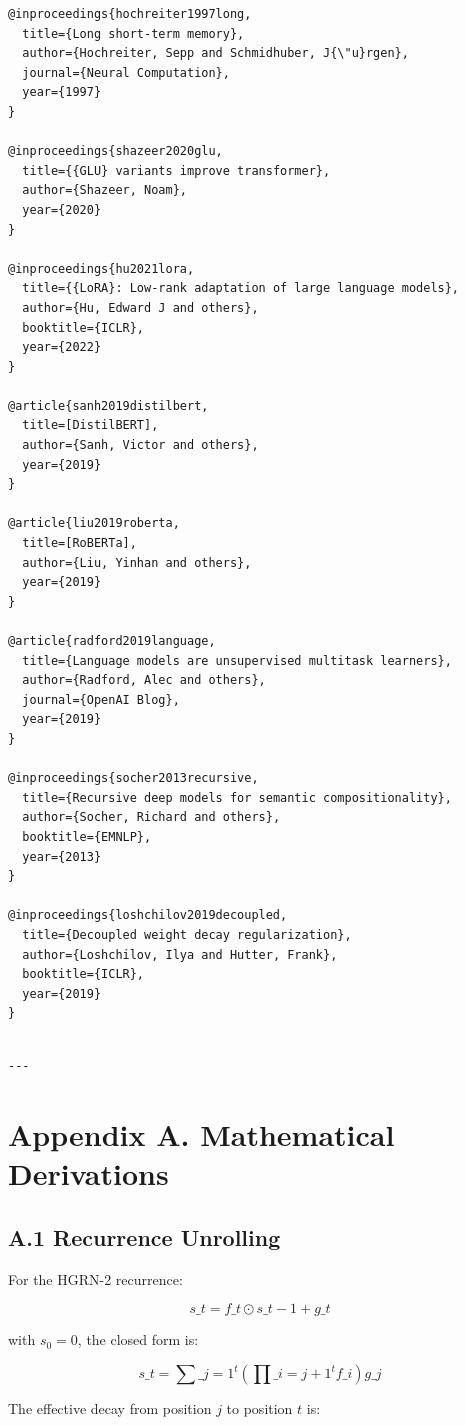 \begin{lstlisting}
@inproceedings{hochreiter1997long,
  title={Long short-term memory},
  author={Hochreiter, Sepp and Schmidhuber, J{\"u}rgen},
  journal={Neural Computation},
  year={1997}
}

@inproceedings{shazeer2020glu,
  title={{GLU} variants improve transformer},
  author={Shazeer, Noam},
  year={2020}
}

@inproceedings{hu2021lora,
  title={{LoRA}: Low-rank adaptation of large language models},
  author={Hu, Edward J and others},
  booktitle={ICLR},
  year={2022}
}

@article{sanh2019distilbert,
  title=[DistilBERT],
  author={Sanh, Victor and others},
  year={2019}
}

@article{liu2019roberta,
  title=[RoBERTa],
  author={Liu, Yinhan and others},
  year={2019}
}

@article{radford2019language,
  title={Language models are unsupervised multitask learners},
  author={Radford, Alec and others},
  journal={OpenAI Blog},
  year={2019}
}

@inproceedings{socher2013recursive,
  title={Recursive deep models for semantic compositionality},
  author={Socher, Richard and others},
  booktitle={EMNLP},
  year={2013}
}

@inproceedings{loshchilov2019decoupled,
  title={Decoupled weight decay regularization},
  author={Loshchilov, Ilya and Hutter, Frank},
  booktitle={ICLR},
  year={2019}
}
\end{lstlisting}
\begin{lstlisting}

---
\end{lstlisting}

\section{Appendix A. Mathematical Derivations}

\subsection{A.1 Recurrence Unrolling}

For the HGRN-2 recurrence:

\[
s\_t = f\_t \odot s\_{t-1} + g\_t
\tag{A.1}
\]

with $s_0 = 0$, the closed form is:

\[
s\_t = \sum\_{j=1}^{t} \left( \prod\_{i=j+1}^{t} f\_i \right) g\_j
\tag{A.2}
\]

The effective decay from position $j$ to position $t$ is:

